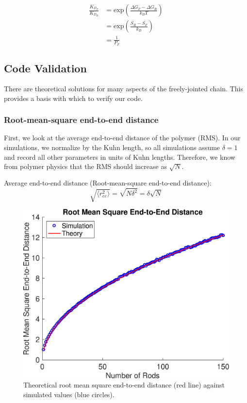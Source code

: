 \documentclass[../AdvancementSummary.tex]{subfiles}
\begin{document}
\begin{align} 
\frac{K_{D_F}}{K_{D_R}} &= \mbox{exp} \left(\frac{\Delta G_F-\Delta G_R}{k_B T}\right) \\
&= \mbox{exp} \left(\frac{S_R-S_F}{k_B}\right) \\
&= \frac{1}{P_F}
\end{align}  


\subsection{Code Validation}
There are theoretical solutions for many aspects of the freely-jointed chain.  This provides a basis with which to verify our code.  


\subsubsection{Root-mean-square end-to-end distance}
First, we look at the average end-to-end distance of the polymer (RMS). In our simulations, we normalize by the Kuhn length, so all simulations assume $\delta = 1$ and record all other parameters in units of Kuhn lengths.  Therefore, we know from polymer physics that the RMS should increase as $\sqrt{N}$.

Average end-to-end distance (Root-mean-square end-to-end distance):
\begin{equation*}
\sqrt{\langle r_{ee}^2 \rangle} = \sqrt{N\delta^2} = \delta \sqrt{N}
\end{equation*}

\begin{figure}[H]
\begin{center}
\includegraphics[width=0.5\linewidth]{ModelConfirmationFigures/RMSEndtoEnd.eps}
\caption{Theoretical root mean square end-to-end distance (red line) against simulated values (blue circles).}
\end{center}
\end{figure}
\end{document}
